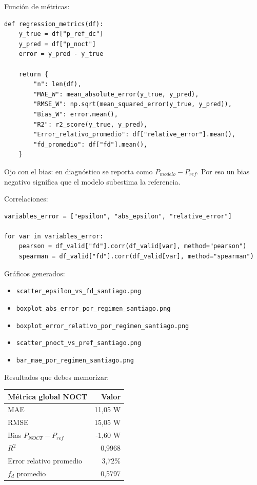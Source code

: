 \documentclass[11pt, letterpaper]{article}
\newcommand{\fd}{f_d}
\begin{document}
Funci\'on de m\'etricas:

\begin{lstlisting}[style=pythonstyle]
def regression_metrics(df):
    y_true = df["p_ref_dc"]
    y_pred = df["p_noct"]
    error = y_pred - y_true

    return {
        "n": len(df),
        "MAE_W": mean_absolute_error(y_true, y_pred),
        "RMSE_W": np.sqrt(mean_squared_error(y_true, y_pred)),
        "Bias_W": error.mean(),
        "R2": r2_score(y_true, y_pred),
        "Error_relativo_promedio": df["relative_error"].mean(),
        "fd_promedio": df["fd"].mean(),
    }
\end{lstlisting}

Ojo con el bias: en diagn\'ostico se reporta como \(P_{modelo}-P_{ref}\). Por eso un bias negativo significa que el modelo subestima la referencia.

Correlaciones:

\begin{lstlisting}[style=pythonstyle]
variables_error = ["epsilon", "abs_epsilon", "relative_error"]

for var in variables_error:
    pearson = df_valid["fd"].corr(df_valid[var], method="pearson")
    spearman = df_valid["fd"].corr(df_valid[var], method="spearman")
\end{lstlisting}

Gr\'aficos generados:

\begin{itemize}
    \item \texttt{scatter\_epsilon\_vs\_fd\_santiago.png}
    \item \texttt{boxplot\_abs\_error\_por\_regimen\_santiago.png}
    \item \texttt{boxplot\_error\_relativo\_por\_regimen\_santiago.png}
    \item \texttt{scatter\_pnoct\_vs\_pref\_santiago.png}
    \item \texttt{bar\_mae\_por\_regimen\_santiago.png}
\end{itemize}

Resultados que debes memorizar:

\begin{center}
\begin{tabular}{lr}
\toprule
\textbf{M\'etrica global NOCT} & \textbf{Valor} \\
\midrule
MAE & 11,05 W \\
RMSE & 15,05 W \\
Bias \(P_{NOCT}-P_{ref}\) & -1,60 W \\
\(R^2\) & 0,9968 \\
Error relativo promedio & 3,72\% \\
\(\fd\) promedio & 0,5797 \\
\bottomrule
\end{tabular}
\end{center}
\end{document}
